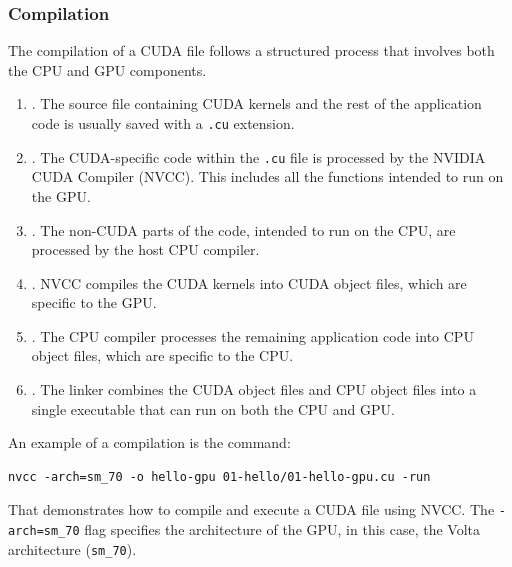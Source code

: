 \subsubsection{Compilation}

The compilation of a CUDA file follows a structured process that involves both the CPU and GPU components.
\begin{enumerate}
   \item {}. The source file containing CUDA kernels and the rest of the application code is usually saved with a \texttt{.cu} extension.

   \item {}. The CUDA-specific code within the \texttt{.cu} file is processed by the NVIDIA CUDA Compiler (NVCC). This includes all the functions intended to run on the GPU.

   \setcounter{enumi}{1}

   \item {}. The non-CUDA parts of the code, intended to run on the CPU, are processed by the host CPU compiler.

   \item {}. NVCC compiles the CUDA kernels into CUDA object files, which are specific to the GPU.

   \setcounter{enumi}{2}

   \item {}. The CPU compiler processes the remaining application code into CPU object files, which are specific to the CPU.

   \item {}. The linker combines the CUDA object files and CPU object files into a single executable that can run on both the CPU and GPU.
\end{enumerate}
An example of a compilation is the command:
\begin{lstlisting}
nvcc -arch=sm_70 -o hello-gpu 01-hello/01-hello-gpu.cu -run
\end{lstlisting}
That demonstrates how to compile and execute a CUDA file using NVCC. The \texttt{-arch=sm\_70} flag specifies the architecture of the GPU, in this case, the Volta architecture (\texttt{sm\_70}).

